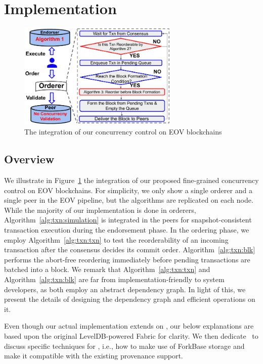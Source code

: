 {\section{Implementation}
\label{sec:txn:impl}

\begin{figure}
  \center
	\includegraphics[width=0.68\textwidth]{diagram/txn/fabricX_arch.pdf}
  \caption{The integration of our concurrency control on EOV blockchains}
	\label{diagram:txn:impl:fabricx}
\end{figure}

\subsection{Overview}
We illustrate in Figure~\ref{diagram:txn:impl:fabricx} the integration of our proposed fine-grained concurrency control on EOV blockchains. 
%
For simplicity, we only show a single orderer and a single peer in the EOV pipeline, but the algorithms are replicated on each node. 
%
While the majority of our implementation is done in orderers, Algorithm~\ref{alg:txn:simulation} is integrated in the peers for snapshot-consistent transaction execution during the endorsement phase.
%
In the ordering phase, we employ Algorithm~\ref{alg:txn:txn} to test the reorderability of an incoming transaction after the consensus decides its commit order.
%
Algorithm~\ref{alg:txn:blk} performs the abort-free reordering immediately before pending transactions are batched into a block. 
%
We remark that Algorithm~\ref{alg:txn:txn} and Algorithm~\ref{alg:txn:blk} are far from implementation-friendly to system developers, as both employ an abstract dependency graph.
%
In light of this, we present the details of designing the dependency graph and efficient operations on it.

Even though our actual implementation extends on {\fs}, our below explanations are based upon the original LevelDB-powered Fabric for clarity. 
%
We then dedicate~ to discuss specific techniques for {\fs} , i.e., how to make use of ForkBase storage and make it compatible with the existing provenance support. 

}
